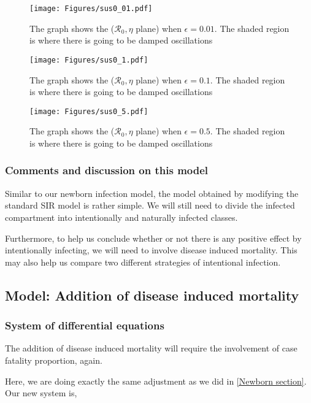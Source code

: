 \documentclass[12pt]{article}
\newcommand{\R}{\mathcal{R}}
\begin{document}
\begin{figure}[H]
  \centering
  \texttt{[image: Figures/sus0\_01.pdf]}
  \caption{The graph shows the ($\R_0,\eta$ plane) when $\epsilon=0.01$. The shaded region is where there is going to be damped oscillations}
\end{figure}

\begin{figure}[H]
  \centering
  \texttt{[image: Figures/sus0\_1.pdf]}
  \caption{The graph shows the ($\R_0,\eta$ plane) when $\epsilon=0.1$. The shaded region is where there is going to be damped oscillations}
\end{figure}

\begin{figure}[H]
  \centering
  \texttt{[image: Figures/sus0\_5.pdf]}
  \caption{The graph shows the ($\R_0,\eta$ plane) when $\epsilon=0.5$. The shaded region is where there is going to be damped oscillations}
\end{figure}

\subsubsection{Comments and discussion on this model}
Similar to our newborn infection model, the model obtained by modifying the standard SIR model is rather simple. We will still need to divide the infected compartment into intentionally and naturally infected classes.

Furthermore, to help us conclude whether or not there is any positive effect by intentionally infecting, we will need to involve disease induced mortality. This may also help us compare two different strategies of intentional infection.

\subsection{Model: Addition of disease induced mortality}

\subsubsection{System of differential equations}

The addition of disease induced mortality will require the involvement of case fatality proportion, again. 

Here, we are doing exactly the same adjustment as we did in \autoref{Newborn section}.
Our new system is,
\end{document}

